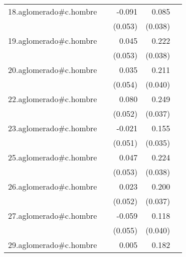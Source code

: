 {\begin{longtable}{l*{4}{D{.}{.}{-1}}}
\addlinespace
18.aglomerado#c.hombre&                     &      -0.091         &       0.085\sym{*}  &                     \\
            &                     &     (0.053)         &     (0.038)         &                     \\
\addlinespace
19.aglomerado#c.hombre&                     &       0.045         &       0.222\sym{***}&                     \\
            &                     &     (0.053)         &     (0.038)         &                     \\
\addlinespace
20.aglomerado#c.hombre&                     &       0.035         &       0.211\sym{***}&                     \\
            &                     &     (0.054)         &     (0.040)         &                     \\
\addlinespace
22.aglomerado#c.hombre&                     &       0.080         &       0.249\sym{***}&                     \\
            &                     &     (0.052)         &     (0.037)         &                     \\
\addlinespace
23.aglomerado#c.hombre&                     &      -0.021         &       0.155\sym{***}&                     \\
            &                     &     (0.051)         &     (0.035)         &                     \\
\addlinespace
25.aglomerado#c.hombre&                     &       0.047         &       0.224\sym{***}&                     \\
            &                     &     (0.053)         &     (0.038)         &                     \\
\addlinespace
26.aglomerado#c.hombre&                     &       0.023         &       0.200\sym{***}&                     \\
            &                     &     (0.052)         &     (0.037)         &                     \\
\addlinespace
27.aglomerado#c.hombre&                     &      -0.059         &       0.118\sym{**} &                     \\
            &                     &     (0.055)         &     (0.040)         &                     \\
\addlinespace
29.aglomerado#c.hombre&                     &       0.005         &       0.182\sym{***}&                     \\

\end{longtable}}
